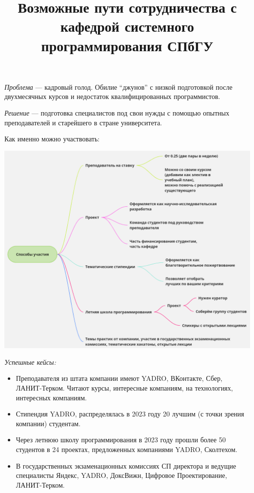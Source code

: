 \documentclass[a5paper]{article}
\title{Возможные пути сотрудничества с кафедрой системного программирования СПбГУ}
\date{}
\begin{document}
\maketitle

\emph{Проблема} --- кадровый голод. Обилие \enquote{джунов} с низкой подготовкой после двухмесячных курсов и недостаток квалифицированных программистов.

\emph{Решение} --- подготовка специалистов под свои нужды с помощью опытных преподавателей и старейшего в стране университета.

Как именно можно участвовать:

\begin{center}
    \includegraphics[width=\textwidth]{partnershipTypes.png}
\end{center}

\emph{Успешные кейсы:}

\begin{itemize}
    \item Преподавателя из штата компании имеют YADRO, ВКонтакте, Сбер, ЛАНИТ-Терком. Читают курсы, интересные компаниям, на технологиях, интересных компаниям.
    \item Стипендия YADRO, распределялась в 2023 году 20 лучшим (с точки зрения компании) студентам.
    \item Через летнюю школу программирования в 2023 году прошли более 50 студентов в 24 проектах, предложенных компаниями YADRO, Сколтехом.
    \item В государственных экзаменационных комиссиях СП директора и ведущие специалисты Яндекс, YADRO, ДоксВижн, Цифровое Проектирование, ЛАНИТ-Терком.
\end{itemize}
\end{document}
